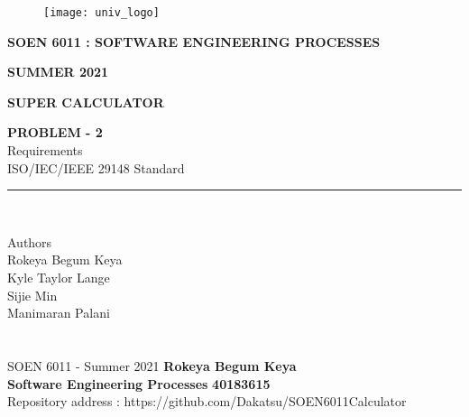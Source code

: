 \documentclass[a4paper, 11pt]{report}
\begin{document}
\begin{titlepage}
\vspace*{0.7in}
\begin{center}
\begin{figure}[htb]
\begin{center}
\texttt{[image: univ\_logo]}
\end{center}
\end{figure}
\vspace*{0.3in}
\begin{Large}
\textbf{SOEN 6011 : SOFTWARE ENGINEERING PROCESSES} \\
\end{Large}
\vspace*{0.1in}
\begin{Large}
\textbf{SUMMER 2021} \\
\end{Large}
\vspace*{0.9in}
\begin{Large}
\textbf{SUPER CALCULATOR} \\
\end{Large}
\vspace*{0.9in}
\begin{Large} 


\textbf{PROBLEM - 2} \\
Requirements\\\footnotesize{ISO/IEC/IEEE} 29148 Standard \\
\end{Large}
\vspace*{0.9in}
\rule{80mm}{0.1mm}\\
\vspace*{0.1in}
\begin{large}
Authors \\
\vspace*{0.1in}
Rokeya Begum Keya\\
\vspace*{0.1in}
Kyle Taylor Lange\\
\vspace*{0.1in}
Sijie Min\\
\vspace*{0.1in}
Manimaran Palani\\ 
\vspace*{0.3in}
\date{\normalsize\today} 
\end{large}
\end{center}
\end{titlepage}

\newpage
\section*{}
\normalsize {SOEN 6011 - Summer 2021} \hfill \textbf{Rokeya Begum Keya} \\
\textbf{ Software Engineering Processes}  \hfill \textbf{40183615} \\
\hfill Repository address : https://github.com/Dakatsu/SOEN6011Calculator
\\
\end{document}
